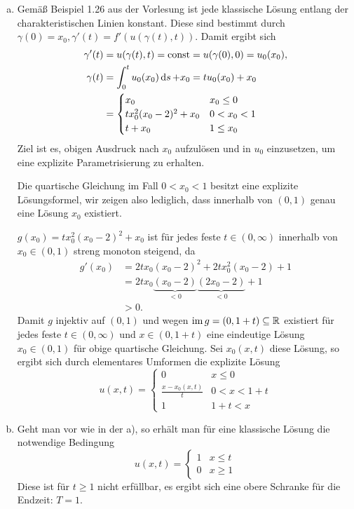 \documentclass{myexercise}
\begin{document}
\newpage
\begin{exercise}[Aufgabe 3]
	\begin{enumerate}[a)]
		\item
			Gemäß Beispiel 1.26 aus der Vorlesung ist jede klassische Lösung entlang der charakteristischen Linien konstant.
			Diese sind bestimmt durch $\gamma(0) = x_0, \gamma'(t) = f'(u(\gamma(t),t))$.
			Damit ergibt sich
			\begin{align*}
				\gamma'(t) &= u(\gamma(t),t) = \const = u(\gamma(0),0) = u_0(x_0), \\
				\gamma(t) &= \int_0^t u_0(x_0) \di[s] + x_0 = t u_0(x_0) + x_0 \\
				&= \begin{cases}
					x_0 & x_0 \le 0\\
					t x_0^2(x_0 - 2)^2 + x_0 & 0 < x_0 < 1 \\
					t + x_0 & 1 \le x_0
				\end{cases}
			\end{align*}
			Ziel ist es, obigen Ausdruck nach $x_0$ aufzulösen und in $u_0$ einzusetzen, um eine explizite Parametrisierung zu erhalten.

			Die quartische Gleichung im Fall $0 < x_0 < 1$ besitzt eine explizite Lösungsformel, wir zeigen also lediglich, dass innerhalb von $(0,1)$ genau eine Lösung $x_0$ existiert.

			$g(x_0) = tx_0^2(x_0-2)^2 + x_0$ ist für jedes feste $t \in (0,\infty)$ innerhalb von $x_0 \in (0,1)$ streng monoton steigend, da
			\begin{align*}
				g'(x_0) &= 2tx_0(x_0-2)^2 + 2tx_0^2(x_0-2) + 1 \\
				&= 2t x_0 \underbrace{(x_0-2)}_{<0}\underbrace{(2x_0-2)}_{<0} + 1 \\
				&> 0.
			\end{align*}
			Damit $g$ injektiv auf $(0,1)$ und wegen $\operatorname{im} g = (0,1+t) \subseteq \mathbb{R}$ existiert für jedes feste $t \in (0,\infty)$ und $x \in (0,1+t)$ eine eindeutige Lösung $x_0 \in (0,1)$ für obige quartische Gleichung.
			Sei $x_0(x,t)$ diese Lösung, so ergibt sich durch elementares Umformen die explizite Lösung
			\[
				u(x,t) = \begin{cases}
					0 & x \le 0 \\
					\frac{x - x_0(x,t)}{t} & 0 < x < 1 + t \\
					1 & 1 + t < x
				\end{cases}
			\]
		\item
			Geht man vor wie in der a), so erhält man für eine klassische Lösung die notwendige Bedingung
			\[
				u(x,t) = \begin{cases}
					1 & x \le t \\
					0 & x \ge 1
				\end{cases}
			\]
			Diese ist für $t \ge 1$ nicht erfüllbar, es ergibt sich eine obere Schranke für die Endzeit: $T = 1$.
	\end{enumerate}
\end{exercise}
\end{document}

